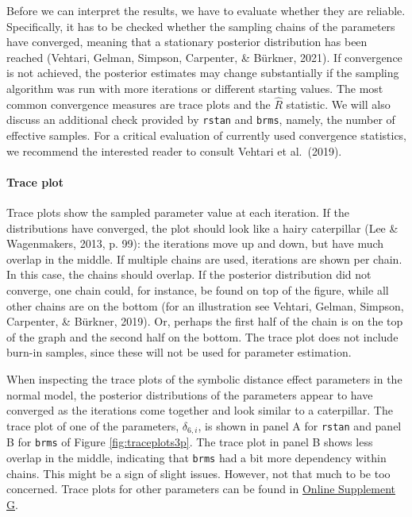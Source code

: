 \documentclass[
  english,
  doc,floatsintext]{apa6}
\let\oldparagraph\paragraph
\renewcommand{\paragraph}[1]{\oldparagraph{#1}\mbox{}}
\begin{document}
Before we can interpret the results, we have to evaluate whether they are reliable. Specifically, it has to be checked whether the sampling chains of the parameters have converged, meaning that a stationary posterior distribution has been reached (Vehtari, Gelman, Simpson, Carpenter, \& Bürkner, 2021). If convergence is not achieved, the posterior estimates may change substantially if the sampling algorithm was run with more iterations or different starting values. The most common convergence measures are trace plots and the \(\hat{R}\) statistic. We will also discuss an additional check provided by \texttt{rstan} and \texttt{brms}, namely, the number of effective samples. For a critical evaluation of currently used convergence statistics, we recommend the interested reader to consult Vehtari et al.~(2019).

\hypertarget{trace-plot}{%
\paragraph{Trace plot}\label{trace-plot}}

Trace plots show the sampled parameter value at each iteration. If the distributions have converged, the plot should look like a hairy caterpillar (Lee \& Wagenmakers, 2013, p. 99): the iterations move up and down, but have much overlap in the middle. If multiple chains are used, iterations are shown per chain. In this case, the chains should overlap. If the posterior distribution did not converge, one chain could, for instance, be found on top of the figure, while all other chains are on the bottom (for an illustration see Vehtari, Gelman, Simpson, Carpenter, \& Bürkner, 2019). Or, perhaps the first half of the chain is on the top of the graph and the second half on the bottom. The trace plot does not include burn-in samples, since these will not be used for parameter estimation.

When inspecting the trace plots of the symbolic distance effect parameters in the normal model, the posterior distributions of the parameters appear to have converged as the iterations come together and look similar to a caterpillar. The trace plot of one of the parameters, \(\delta_{6, i}\), is shown in panel A for \texttt{rstan} and panel B for \texttt{brms} of Figure \ref{fig:traceplots3p}. The trace plot in panel B shows less overlap in the middle, indicating that \texttt{brms} had a bit more dependency within chains. This might be a sign of slight issues. However, not that much to be too concerned. Trace plots for other parameters can be found in
\href{https://github.com/MyrtheV/Bayesian-Hierarchical-Modelling-An-Introduction-and-Reassessment/tree/main/G\%20-\%20Trace\%20Plots\%20}{Online Supplement G}.
\end{document}
